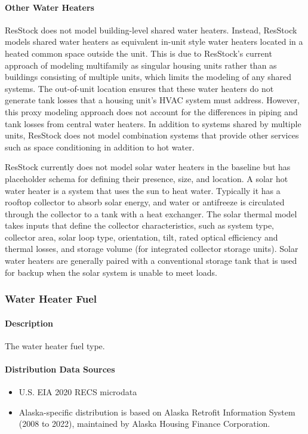 \paragraph{Other Water Heaters}
ResStock does not model building-level shared water heaters. Instead, ResStock models shared water heaters as equivalent in-unit style water heaters located in a heated common space outside the unit. This is due to ResStock’s current approach of modeling multifamily as singular housing units rather than as buildings consisting of multiple units, which limits the modeling of any shared systems. The out-of-unit location ensures that these water heaters do not generate tank losses that a housing unit's HVAC system must address. However, this proxy modeling approach does not account for the differences in piping and tank losses from central water heaters. In addition to systems shared by multiple units, ResStock does not model combination systems that provide other services such as space conditioning in addition to hot water.

ResStock currently does not model solar water heaters in the baseline but has placeholder schema for defining their presence, size, and location. A solar hot water heater is a system that uses the sun to heat water. Typically it has a rooftop collector to absorb solar energy, and water or antifreeze is circulated through the collector to a tank with a heat exchanger. The solar thermal model takes inputs that define the collector characteristics, such as system type, collector area, solar loop type, orientation, tilt, rated optical efficiency and thermal losses, and storage volume (for integrated collector storage units). Solar water heaters are generally paired with a conventional storage tank that is used for backup when the solar system is unable to meet loads.

\subsubsection{Water Heater Fuel}\label{water_heater_fuel}
\paragraph{Description}
The water heater fuel type.

\paragraph{Distribution Data Sources}
\begin{itemize}
\item
  U.S. EIA 2020 RECS microdata
\item
  Alaska-specific distribution is based on Alaska Retrofit Information
  System (2008 to 2022), maintained by Alaska Housing Finance
  Corporation.
\end{itemize}

